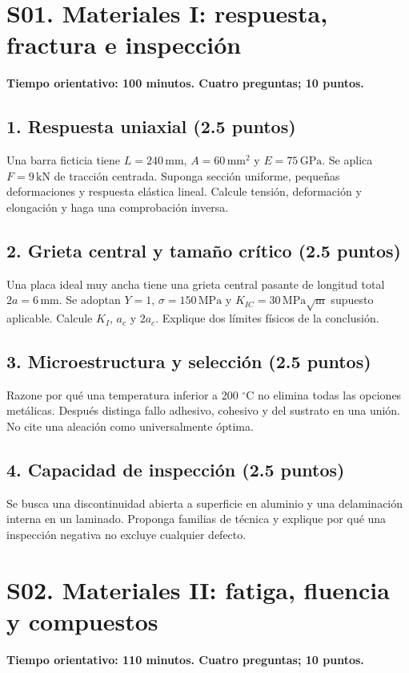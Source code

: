 \chapter{S01. Materiales I: respuesta, fractura e inspección}
\noindent\textbf{Tiempo orientativo: 100 minutos. Cuatro preguntas; 10 puntos.}
\section*{1. Respuesta uniaxial (2.5 puntos)}
Una barra ficticia tiene $L=240\,\mathrm{mm}$, $A=60\,\mathrm{mm^2}$ y $E=75\,\mathrm{GPa}$. Se aplica $F=9\,\mathrm{kN}$ de tracción centrada. Suponga sección uniforme, pequeñas deformaciones y respuesta elástica lineal. Calcule tensión, deformación y elongación y haga una comprobación inversa.

\section*{2. Grieta central y tamaño crítico (2.5 puntos)}
Una placa ideal muy ancha tiene una grieta central pasante de longitud total $2a=6\,\mathrm{mm}$. Se adoptan $Y=1$, $\sigma=150\,\mathrm{MPa}$ y $K_{IC}=30\,\mathrm{MPa\sqrt m}$ supuesto aplicable. Calcule $K_I$, $ a_c $ y $2a_c $. Explique dos límites físicos de la conclusión.

\section*{3. Microestructura y selección (2.5 puntos)}
Razone por qué una temperatura inferior a 200 $^\circ\mathrm C$ no elimina todas las opciones metálicas. Después distinga fallo adhesivo, cohesivo y del sustrato en una unión. No cite una aleación como universalmente óptima.

\section*{4. Capacidad de inspección (2.5 puntos)}
Se busca una discontinuidad abierta a superficie en aluminio y una delaminación interna en un laminado. Proponga familias de técnica y explique por qué una inspección negativa no excluye cualquier defecto.

\chapter{S02. Materiales II: fatiga, fluencia y compuestos}
\noindent\textbf{Tiempo orientativo: 110 minutos. Cuatro preguntas; 10 puntos.}
